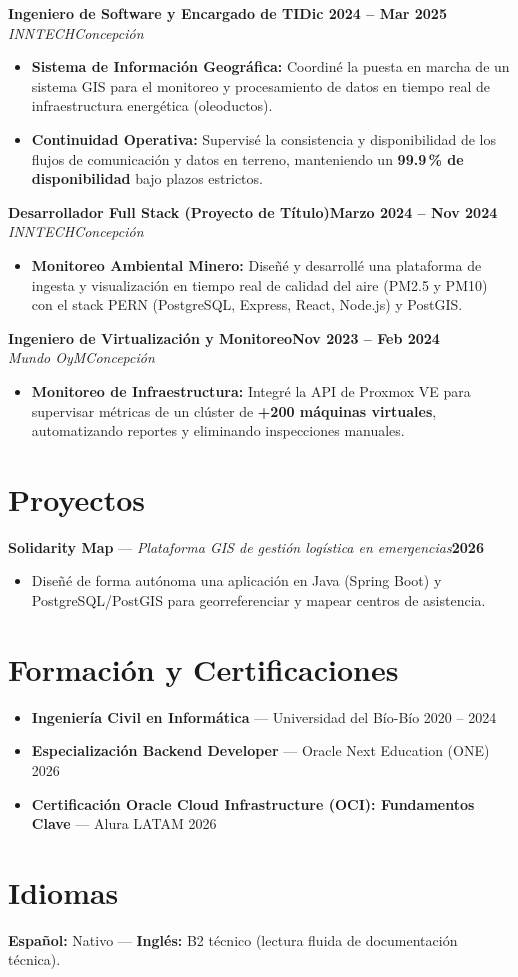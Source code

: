 \documentclass[10pt,a4paper]{article}
\newcommand{\cargo}[4]{\needspace{5\baselineskip}%
  \textbf{#1}\hfill\textbf{#2}\\
  \textit{#3}\hfill\textit{#4}\vspace{-2pt}}
\begin{document}
\vspace{4pt}
\cargo{Ingeniero de Software y Encargado de TI}{Dic 2024 -- Mar 2025}{INNTECH}{Concepción}
\begin{itemize}
  \item \textbf{Sistema de Información Geográfica:} Coordiné la puesta en marcha de un sistema GIS para el monitoreo y procesamiento de datos en tiempo real de infraestructura energética (oleoductos).
  \item \textbf{Continuidad Operativa:} Supervisé la consistencia y disponibilidad de los flujos de comunicación y datos en terreno, manteniendo un \textbf{99.9\,\% de disponibilidad} bajo plazos estrictos.
\end{itemize}

\vspace{4pt}
\cargo{Desarrollador Full Stack (Proyecto de Título)}{Marzo 2024 -- Nov 2024}{INNTECH}{Concepción}
\begin{itemize}
  \item \textbf{Monitoreo Ambiental Minero:} Diseñé y desarrollé una plataforma de ingesta y visualización en tiempo real de calidad del aire (PM2.5 y PM10) con el stack PERN (PostgreSQL, Express, React, Node.js) y PostGIS.
\end{itemize}

\vspace{4pt}
\cargo{Ingeniero de Virtualización y Monitoreo}{Nov 2023 -- Feb 2024}{Mundo OyM}{Concepción}
\begin{itemize}
  \item \textbf{Monitoreo de Infraestructura:} Integré la API de Proxmox VE para supervisar métricas de un clúster de \textbf{+200 máquinas virtuales}, automatizando reportes y eliminando inspecciones manuales.
\end{itemize}

\section{Proyectos}
\textbf{Solidarity Map} --- \textit{Plataforma GIS de gestión logística en emergencias}\hfill\textbf{2026}
\begin{itemize}
  \item Diseñé de forma autónoma una aplicación en Java (Spring Boot) y PostgreSQL/PostGIS para georreferenciar y mapear centros de asistencia.
\end{itemize}

\section{Formación y Certificaciones}
\begin{itemize}
  \item \textbf{Ingeniería Civil en Informática} --- Universidad del Bío-Bío \hfill 2020 -- 2024
  \item \textbf{Especialización Backend Developer} --- Oracle Next Education (ONE) \hfill 2026
  \item \textbf{Certificación Oracle Cloud Infrastructure (OCI): Fundamentos Clave} --- Alura LATAM \hfill 2026
\end{itemize}

\section{Idiomas}
\textbf{Español:} Nativo \quad --- \quad \textbf{Inglés:} B2 técnico (lectura fluida de documentación técnica).
\end{document}
